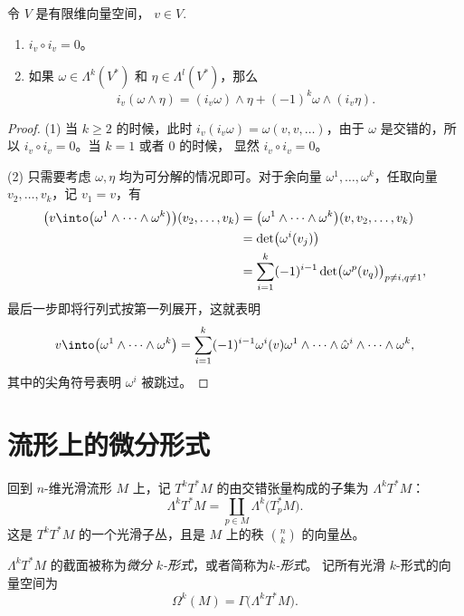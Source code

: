 \begin{lemma}
  令 $V$ 是有限维向量空间， $v\in V$.
  \begin{enumerate}
    \item $i_v\circ i_v=0$。
    \item 如果 $\omega\in \Lambda^k(V^*)$ 和 $\eta\in\Lambda^l(V^*)$，那么
    \begin{equation}
      i_v(\omega\wedge\eta)=(i_v\omega)\wedge\eta+(-1)^k\omega\wedge(i_v\eta).
    \end{equation}
  \end{enumerate}
\end{lemma}
\begin{proof}
  (1) 当 $k\geq 2$ 的时候，此时 $i_v(i_v\omega)=\omega(v,v,\dots)$，由于
  $\omega$ 是交错的，所以 $i_v\circ i_v=0$。当 $k=1$ 或者 $0$ 的时候，
  显然 $i_v\circ i_v=0$。

  (2) 只需要考虑 $\omega,\eta$ 均为可分解的情况即可。对于余向量
  $\omega^1,\dots,\omega^k$，任取向量 $v_2,\dots,v_k$，记
  $v_1=v$，有 
  \begin{align*}
    \bigl(v\into\bigl(\omega^1\wedge\cdots\wedge\omega^k\bigr)\bigr)
    (v_2,\dots,v_k)&=\bigl(\omega^1\wedge\cdots\wedge\omega^k\bigr)(v,v_2,\dots,v_k)\\
    &=\det\bigl(\omega^i(v_j)\bigr)\\
    &=\sum_{i=1}^k (-1)^{i-1}
    \det\bigl(\omega^p(v_q)\bigr)_{p\ne i,q\neq 1},
  \end{align*}
  最后一步即将行列式按第一列展开，这就表明
  \begin{equation*}
    v\into\bigl(\omega^1\wedge\cdots\wedge\omega^k\bigr)
    =\sum_{i=1}^k(-1)^{i-1}\omega^i(v)\omega^1\wedge\cdots\wedge
    \hat\omega^i\wedge\cdots\wedge \omega^k,
  \end{equation*}
  其中的尖角符号表明 $\omega^i$ 被跳过。
\end{proof}
 
\section{流形上的微分形式}

回到 $n$-维光滑流形 $M$ 上，记 $T^kT^*M$ 的由交错张量构成的子集为
$\Lambda^kT^*M$：
\[
  \Lambda^k T^*M=\coprod_{p\in M}\Lambda^k\bigl(T_p^*M\bigr).
\]
这是 $T^kT^*M$ 的一个光滑子丛，且是 $M$ 上的秩 $\binom{n}{k}$ 的向量丛。

$\Lambda^kT^*M$ 的截面被称为\emph{微分 $k$-形式}，或者简称为\emph{$k$-形式}。
记所有光滑 $k$-形式的向量空间为
\[
  \Omega^k(M)=\Gamma\bigl(\Lambda^kT^*M\bigr)  .
\]

